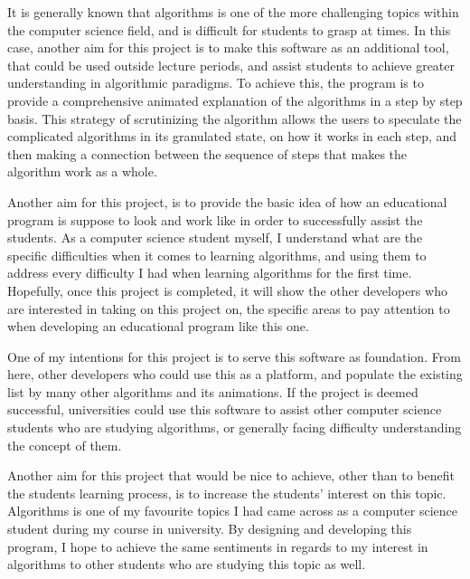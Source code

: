 It is generally known that algorithms is one of the more challenging topics within the computer science field, and is difficult for students to grasp at times. In this case, another aim for this project is to make this software as an additional tool, that could be used outside lecture periods, and assist students to achieve greater understanding in algorithmic paradigms. To achieve this, the program is to provide a comprehensive animated explanation of the algorithms in a step by step basis. 
This strategy of scrutinizing the algorithm allows the users to speculate the complicated algorithms in its granulated state, on how it works in each step, and then making a connection between the sequence of steps that makes the algorithm work as a whole.

Another aim for this project, is to provide the basic idea of how an educational program is suppose to look and work like in order to successfully assist the students. As a computer science student myself, I understand what are the specific difficulties when it comes to learning algorithms, and using them to address every difficulty I had when learning algorithms for the first time. Hopefully, once this project is completed, it will show the other developers who are interested in taking on this project on, the specific areas to pay attention to when developing an educational program like this one. 

One of my intentions for this project is to serve this software as foundation. From here, other developers who could use this as a platform, and populate the existing list by many other algorithms and its animations. If the project is deemed successful, universities could use this software to assist other computer science students who are studying algorithms, or generally facing difficulty understanding the concept of them.

Another aim for this project that would be nice to achieve, other than to benefit the students learning process, is to increase the students' interest on this topic. Algorithms is one of my favourite topics I had came across as a computer science student during my course in university. By designing and developing this program, I hope to achieve the same sentiments in regards to my interest in algorithms to other students who are studying this topic as well.

